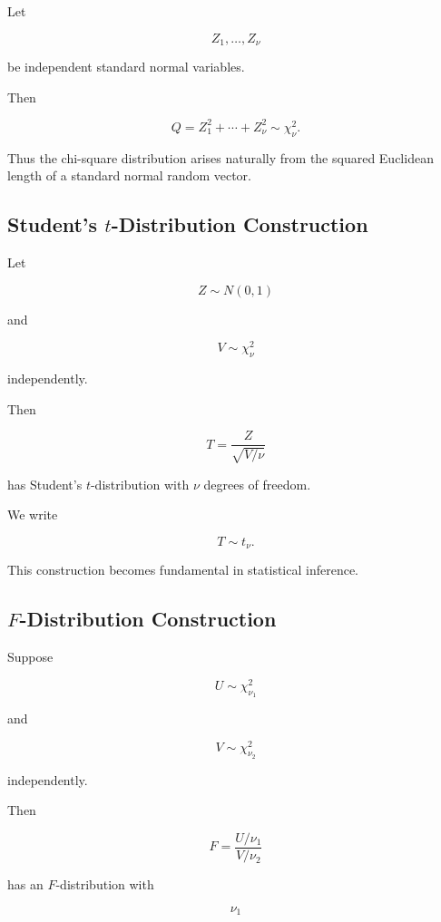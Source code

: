 Let

\[
Z_1,\ldots,Z_\nu
\]

be independent standard normal variables.

Then

\[
\boxed{
Q
=
Z_1^2+\cdots+Z_\nu^2
\sim
\chi^2_\nu.
}
\]

Thus the chi-square distribution arises naturally from the squared
Euclidean length of a standard normal random vector.

\subsection{Student's \(t\)-Distribution Construction}
\label{subsec:t-distribution-construction}

Let

\[
Z\sim N(0,1)
\]

and

\[
V\sim\chi^2_\nu
\]

independently.

Then

\[
\boxed{
T
=
\frac{
Z
}{
\sqrt{V/\nu}
}
}
\]

has Student's \(t\)-distribution with \(\nu\) degrees of freedom.

We write

\[
\boxed{
T\sim t_\nu.
}
\]

This construction becomes fundamental in statistical inference.

\subsection{\(F\)-Distribution Construction}
\label{subsec:f-distribution-construction}

Suppose

\[
U\sim\chi^2_{\nu_1}
\]

and

\[
V\sim\chi^2_{\nu_2}
\]

independently.

Then

\[
\boxed{
F
=
\frac{
U/\nu_1
}{
V/\nu_2
}
}
\]

has an \(F\)-distribution with

\[
\nu_1
\]

